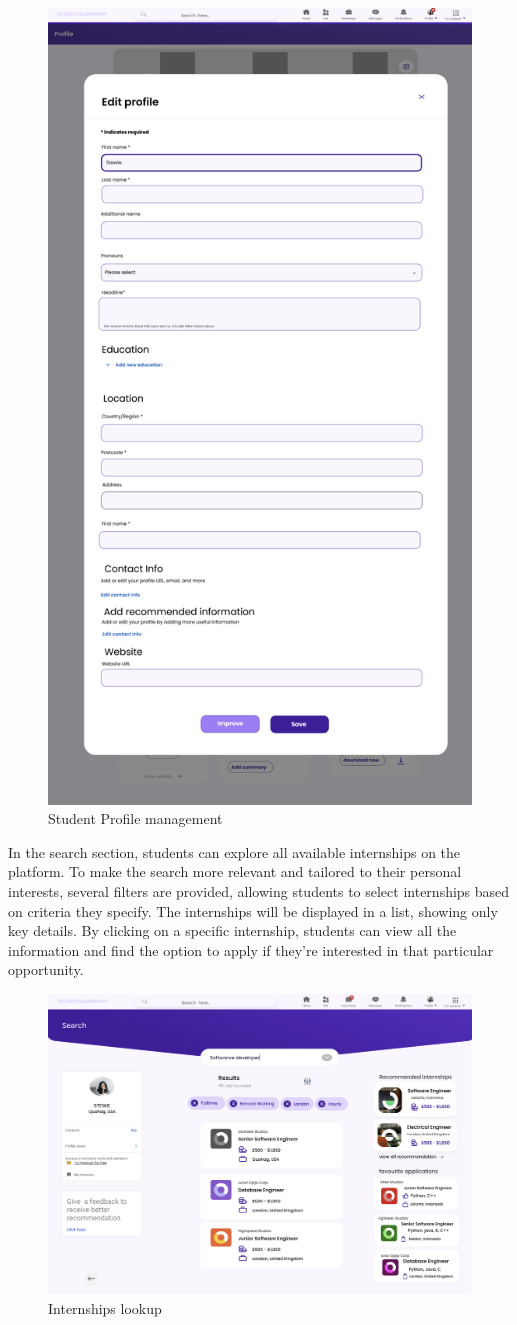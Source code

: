 \begin{figure} [H]
    \centering
    \includegraphics[width=0.5\linewidth]{Interface Images/student interface/Screenshot 2024-12-12 045447.png}
    \caption{Student Profile management}
    \label{fig:Student Profile management}
\end{figure}


In the search section, students can explore all available internships on the platform. To make the search more relevant and tailored to their personal interests, several filters are provided, allowing students to select internships based on criteria they specify. The internships will be displayed in a list, showing only key details. By clicking on a specific internship, students can view all the information and find the option to apply if they're interested in that particular opportunity.

\begin{figure} [H]
    \centering
    \includegraphics[width=0.5\linewidth]{Interface Images/student interface/Screenshot 2024-12-12 045606.png}
    \caption{Internships lookup}
    \label{fig: Internships lookup}
\end{figure}

